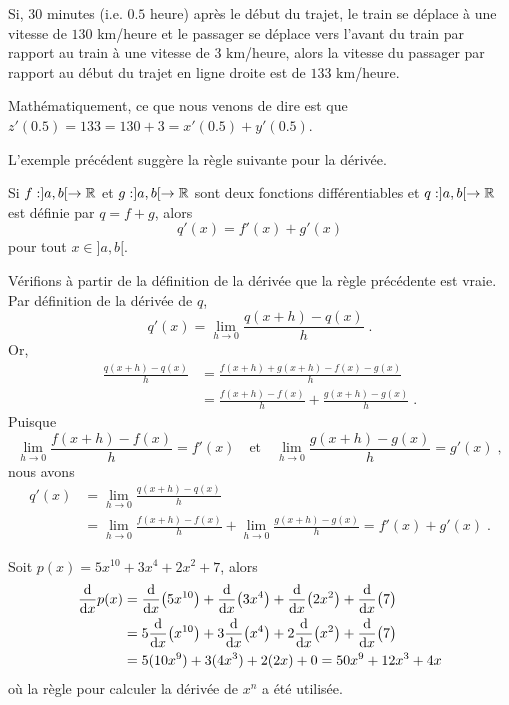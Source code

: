 {\begin{egg}
Si, $30$ minutes (i.e. $0.5$ heure) après le début du trajet, le train
se déplace à une vitesse de $130$ km/heure et le passager se déplace 
vers l'avant du train par rapport au train à une vitesse de $3$
km/heure, alors la vitesse du passager par rapport au début du trajet
en ligne droite est de $133$ km/heure.

Mathématiquement, ce que nous venons de dire est que
$z'(0.5) = 133 = 130 + 3 = x'(0.5) + y'(0.5)$.
\end{egg}

L'exemple précédent suggère la règle suivante pour la dérivée.

\begin{focus}{\thm}
Si $f:]a,b[\rightarrow \RR$ et $g:]a,b[\rightarrow \RR$ sont deux
fonctions différentiables et $q:]a,b[\rightarrow \RR$ est définie par
$q=f+g$, alors
\[
q'(x) = f'(x) + g'(x)
\]
pour tout $x\in ]a,b[$.
\end{focus}

Vérifions à partir de la définition de la dérivée que la règle
précédente est vraie.  Par définition de la dérivée de $q$,
\[
q'(x) = \lim_{h\rightarrow 0} \frac{q(x+h)-q(x)}{h} \; .
\]
Or,
\begin{align*}
\frac{q(x+h)-q(x)}{h} &= \frac{f(x+h)+g(x+h) - f(x) - g(x)}{h} \\
&= \frac{f(x+h)- f(x)}{h} + \frac{g(x+h) - g(x)}{h} \; .
\end{align*}
Puisque
\[
\lim_{h\rightarrow 0} \frac{f(x+h)- f(x)}{h} = f'(x)
\quad \text{et} \quad
\lim_{h\rightarrow 0} \frac{g(x+h)- g(x)}{h} = g'(x) \; ,
\]
nous avons
\begin{align*}
q'(x) &= \lim_{h\rightarrow 0} \frac{q(x+h)-q(x)}{h} \\
&= \lim_{h\rightarrow 0} \frac{f(x+h)- f(x)}{h}  + 
\lim_{h\rightarrow 0} \frac{g(x+h)- g(x)}{h} = f'(x) + g'(x) \; .
\end{align*}

\begin{egg}
Soit $p(x) = 5x^{10} + 3x^4 + 2x^2 +7$, alors
\begin{align*}
\dfdx{p(x)}{x} &= \dfdx{\big(5x^{10}\big)}{x}
+ \dfdx{\big(3x^4\big)}{x} + \dfdx{\big(2x^2\big)}{x}
+ \dfdx{\big(7\big)}{x} \\
&= 5\dfdx{\big(x^{10}\big)}{x} + 3\dfdx{\big(x^4\big)}{x}
+ 2\dfdx{\big(x^2\big)}{x} + \dfdx{\big(7\big)}{x} \\
&= 5(10x^9) + 3(4x^3) + 2(2x) + 0 = 50x^9 + 12x^3 + 4x
\end{align*}
où la règle pour calculer la dérivée de $x^n$ a été utilisée.
\end{egg}

}

